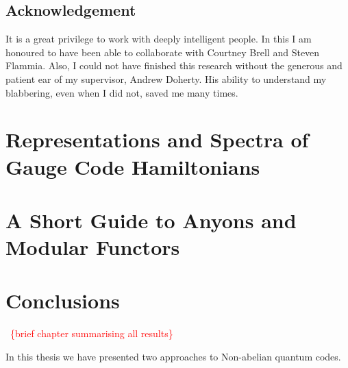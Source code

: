 \documentclass[11pt,oneside]{report}
\newcommand{\danbrowne}[1]{\ \textcolor{red}{\{#1\}}\ }
\begin{document}
\section{Acknowledgement}

It is a great privilege to work with deeply intelligent people.
In this I am honoured to have been able to collaborate with Courtney
Brell and Steven Flammia. Also, I could not have finished this
research without the generous and patient ear of my supervisor, Andrew Doherty.
His ability to understand my blabbering, even when I did not, saved me many times.


\chapter{Representations and Spectra of Gauge Code Hamiltonians}




\chapter{A Short Guide to Anyons and Modular Functors}






\chapter{Conclusions}

\danbrowne{brief chapter summarising all results}

In this thesis we have presented two approaches to
Non-abelian quantum codes.



{}

\end{document}

